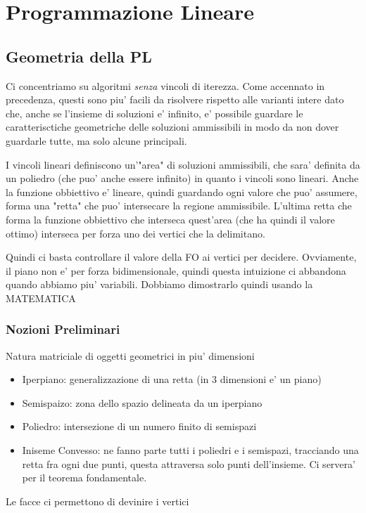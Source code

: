 % 
\chapter{Programmazione Lineare}
\section{Geometria della PL}
Ci concentriamo su algoritmi \textit{senza} vincoli di iterezza. Come accennato in precedenza, questi sono piu' facili da risolvere rispetto alle varianti intere dato che, anche se l'insieme di soluzioni e' infinito, e' possibile guardare le caratterisctiche geometriche delle soluzioni ammissibili in modo da non dover guardarle tutte, ma solo alcune principali.

I vincoli lineari definiscono un'"area" di soluzioni ammissibili, che sara' definita da un poliedro (che puo' anche essere infinito) in quanto i vincoli sono lineari. Anche la funzione obbiettivo e' lineare, quindi guardando ogni valore che puo' assumere, forma una "retta" che puo' intersecare la regione ammissibile. L'ultima retta che forma la funzione obbiettivo che interseca quest'area (che ha quindi il valore ottimo) interseca per forza uno dei vertici che la delimitano.

Quindi ci basta controllare il valore della FO ai vertici per decidere. Ovviamente, il piano non e' per forza bidimensionale, quindi questa intuizione ci abbandona quando abbiamo piu' variabili. Dobbiamo dimostrarlo quindi usando la MATEMATICA

\subsection{Nozioni Preliminari}
Natura matriciale di oggetti geometrici in piu' dimensioni
\begin{itemize}
  \item Iperpiano: generalizzazione di una retta (in 3 dimensioni e' un piano)
  \item Semispaizo: zona dello spazio delineata da un iperpiano
  \item Poliedro: intersezione di un numero finito di semispazi
  \item Iniseme Convesso: ne fanno parte tutti i poliedri e i semispazi, tracciando una retta fra ogni due punti, questa attraversa solo punti dell'insieme. Ci servera' per il teorema fondamentale.
\end{itemize}

Le facce ci permettono di devinire i vertici

